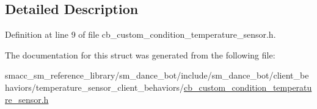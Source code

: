 \subsection{Detailed Description}


Definition at line 9 of file cb\+\_\+custom\+\_\+condition\+\_\+temperature\+\_\+sensor.\+h.



The documentation for this struct was generated from the following file\+:\begin{DoxyCompactItemize}
\item 
smacc\+\_\+sm\+\_\+reference\+\_\+library/sm\+\_\+dance\+\_\+bot/include/sm\+\_\+dance\+\_\+bot/client\+\_\+behaviors/temperature\+\_\+sensor\+\_\+client\+\_\+behaviors/\hyperlink{cb__custom__condition__temperature__sensor_8h}{cb\+\_\+custom\+\_\+condition\+\_\+temperature\+\_\+sensor.\+h}\end{DoxyCompactItemize}
